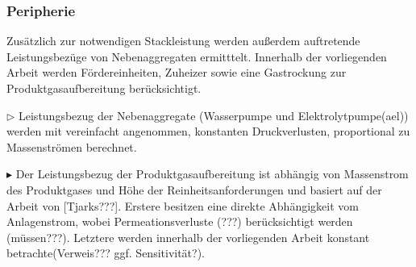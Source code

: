 \documentclass[onecolumn,10pt,titlepage]{article}
\begin{document}
\subsubsection{Peripherie}
\label{subsubs_mod_Periph}
Zusätzlich zur notwendigen Stackleistung werden außerdem auftretende Leistungsbezüge von Nebenaggregaten ermitttelt. Innerhalb der vorliegenden Arbeit werden Fördereinheiten, Zuheizer sowie eine Gastrockung zur Produktgasaufbereitung berücksichtigt. 

$\triangleright$ Leistungsbezug der Nebenaggregate (Wasserpumpe und Elektrolytpumpe(\gls{ael})) werden mit vereinfacht angenommen, konstanten Druckverlusten, proportional zu Massenströmen berechnet.
\newline


$\blacktriangleright$ Der Leistungsbezug der Produktgasaufbereitung ist abhängig von Massenstrom des Produktgases und Höhe der Reinheitsanforderungen und basiert auf der Arbeit von [Tjarks???]. Erstere besitzen eine direkte Abhängigkeit vom Anlagenstrom, wobei Permeationsverluste (???) berücksichtigt werden (müssen???). Letztere werden innerhalb der vorliegenden Arbeit konstant betrachte(Verweis??? ggf. Sensitivität?).





\end{document}
